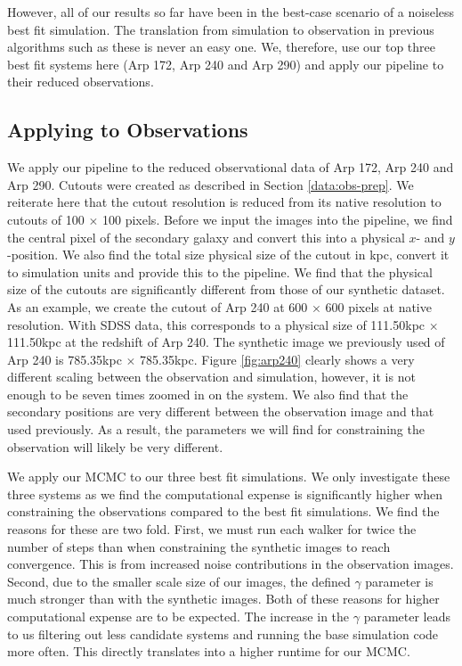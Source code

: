 However, all of our results so far have been in the best-case scenario of a noiseless best fit simulation. The translation from simulation to observation in previous algorithms such as these is never an easy one. We, therefore, use our top three best fit systems here (Arp 172, Arp 240 and Arp 290) and apply our pipeline to their reduced observations.

\subsection{Applying to Observations}
\noindent We apply our pipeline to the reduced observational data of Arp 172, Arp 240 and Arp 290. Cutouts were created as described in Section \ref{data:obs-prep}. We reiterate here that the cutout resolution is reduced from its native resolution to cutouts of 100 $\times$ 100 pixels. Before we input the images into the pipeline, we find the central pixel of the secondary galaxy and convert this into a physical $x$- and $y$-position. We also find the total size physical size of the cutout in kpc, convert it to simulation units and provide this to the pipeline. We find that the physical size of the cutouts are significantly different from those of our synthetic dataset. As an example, we create the cutout of Arp 240 at 600 $\times$ 600 pixels at native resolution. With SDSS data, this corresponds to a physical size of 111.50kpc $\times$ 111.50kpc at the redshift of Arp 240. The synthetic image we previously used of Arp 240 is 785.35kpc $\times$ 785.35kpc. Figure \ref{fig:arp240} clearly shows a very different scaling between the observation and simulation, however, it is not enough to be seven times zoomed in on the system. We also find that the secondary positions are very different between the observation image and that used previously. As a result, the parameters we will find for constraining the observation will likely be very different. 

We apply our MCMC to our three best fit simulations. We only investigate these three systems as we find the computational expense is significantly higher when constraining the observations compared to the best fit simulations. We find the reasons for these are two fold. First, we must run each walker for twice the number of steps than when constraining the synthetic images to reach convergence. This is from increased noise contributions in the observation images. Second, due to the smaller scale size of our images, the defined $\gamma$ parameter is much stronger than with the synthetic images. Both of these reasons for higher computational expense are to be expected. The increase in the $\gamma$ parameter leads to us filtering out less candidate systems and running the base simulation code more often. This directly translates into a higher runtime for our MCMC.

